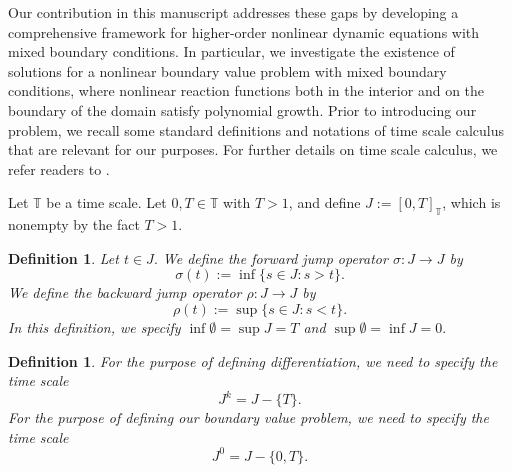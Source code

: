 \documentclass[reqno, 12pt]{amsart}
\newtheorem{definition}[theorem]{Definition}
\numberwithin{equation}{section}
\begin{document}
Our contribution in this manuscript addresses these gaps by developing a comprehensive framework for higher-order nonlinear dynamic equations with mixed boundary conditions. In particular, we investigate the existence of solutions for a nonlinear boundary value problem with mixed boundary conditions, where nonlinear reaction functions both in the interior and on the boundary of the domain satisfy polynomial growth. Prior to introducing our problem, we recall some standard definitions and notations of time scale calculus that are relevant for our purposes. For further details on time scale calculus, we refer readers to \cite{BP}.


Let $\mathbb{T}$ be a time scale. Let $0, T \in \mathbb{T}$ with $T > 1$, and define  $J := [0, T]_{\mathbb{T}}$, which is nonempty by the fact $T>1$.

\begin{definition}
Let $t \in J.$ We define the forward jump operator $\sigma : J \rightarrow J$ by $$\sigma(t) := \inf\{s \in J : s > t\}.$$
We define the backward jump operator $\rho : J \rightarrow J$ by $$\rho(t) := \sup\{s \in J : s < t\}.$$
In this definition, we specify $\inf \emptyset = \sup J = T$ and $\sup \emptyset = \inf J = 0.$
\end{definition}
\begin{definition}
For the purpose of defining differentiation, we need to specify the time scale $$J^k = J - \{ T \}.$$
For the purpose of defining our boundary value problem, we need to specify the time scale $$J^0 = J - \{ 0,T \}.$$
\end{definition}
\end{document}
